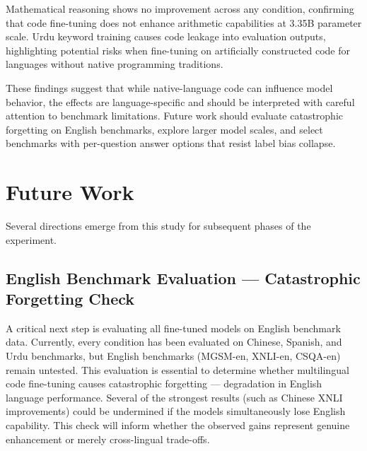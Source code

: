 \documentclass[conference]{IEEEtran}
\begin{document}
Mathematical reasoning shows no improvement across any condition, confirming that code fine-tuning does not enhance arithmetic capabilities at 3.35B parameter scale. Urdu keyword training causes code leakage into evaluation outputs, highlighting potential risks when fine-tuning on artificially constructed code for languages without native programming traditions.

These findings suggest that while native-language code can influence model behavior, the effects are language-specific and should be interpreted with careful attention to benchmark limitations. Future work should evaluate catastrophic forgetting on English benchmarks, explore larger model scales, and select benchmarks with per-question answer options that resist label bias collapse.

\section{Future Work}
\label{sec:future}

Several directions emerge from this study for subsequent phases of the experiment.

\subsection{English Benchmark Evaluation — Catastrophic Forgetting Check}
A critical next step is evaluating all fine-tuned models on English benchmark data. Currently, every condition has been evaluated on Chinese, Spanish, and Urdu benchmarks, but English benchmarks (MGSM-en, XNLI-en, CSQA-en) remain untested. This evaluation is essential to determine whether multilingual code fine-tuning causes catastrophic forgetting — degradation in English language performance. Several of the strongest results (such as Chinese XNLI improvements) could be undermined if the models simultaneously lose English capability. This check will inform whether the observed gains represent genuine enhancement or merely cross-lingual trade-offs.
\end{document}
